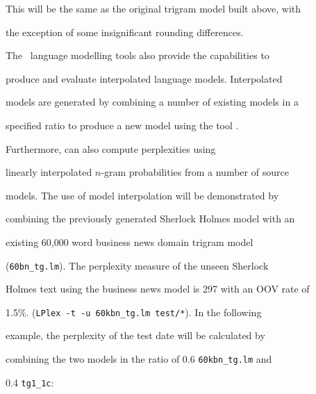 This will be the same as the original trigram model built above, with


the exception of some insignificant rounding differences.












The \HTK\ language modelling tools also provide the capabilities to


produce and evaluate interpolated language models.  Interpolated


models are generated by combining a number of existing models in a


specified ratio to produce a new model using the tool .


Furthermore,  can also compute perplexities using


linearly interpolated $n$-gram probabilities from a number of source


models.  The use of model interpolation will be demonstrated by


combining the previously generated Sherlock Holmes model with an


existing 60,000 word business news domain trigram model


(\texttt{60bn\_tg.lm}).  The perplexity measure of the unseen Sherlock


Holmes text using the business news model is 297 with an OOV rate of


1.5\%.  ({\tt LPlex -t -u 60kbn\_tg.lm test/*}). In the following


example, the perplexity of the test date will be calculated by


combining the two models in the ratio of 0.6 \texttt{60kbn\_tg.lm} and


0.4 \texttt{tg1\_1c}:


